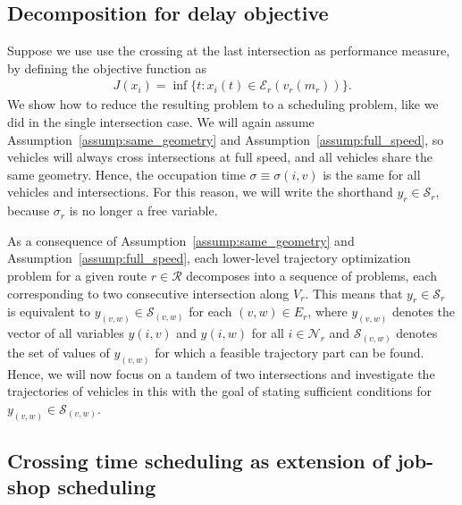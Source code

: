 \documentclass[a4paper]{article}
\theoremstyle{definition}
\theoremstyle{plain}
\begin{document}
\subsection{Decomposition for delay objective}

Suppose we use use the crossing at the last intersection as performance measure, by defining the
objective function as
\begin{align*}
  J(x_{i}) = \inf \{ t: x_{i}(t) \in \mathcal{E}_{r}(v_{r}(m_{r}))\} .
\end{align*}
%
We show how to reduce the resulting problem to a scheduling problem, like we did
in the single intersection case.
%
We will again assume Assumption~\ref{assump:same_geometry} and
Assumption~\ref{assump:full_speed}, so vehicles will always cross intersections
at full speed, and all vehicles share the same geometry. Hence, the occupation
time $\sigma \equiv \sigma(i,v)$ is the same for all vehicles and intersections. For this
reason, we will write the shorthand $y_{r} \in \mathcal{S}_{r}$, because $\sigma_{r}$
is no longer a free variable.

As a consequence of Assumption~\ref{assump:same_geometry} and Assumption~\ref{assump:full_speed},
each lower-level trajectory optimization problem for a given route
$r \in \mathcal{R}$ decomposes into a sequence of problems, each corresponding to
two consecutive intersection along $V_{r}$.
%
This means that $y_{r} \in \mathcal{S}_{r}$ is equivalent to
$y_{(v,w)} \in \mathcal{S}_{(v,w)}$ for each $(v,w) \in E_{r}$, where
$y_{(v,w)}$ denotes the vector of all variables $y(i, v)$ and $y(i, w)$ for all
$i \in \mathcal{N}_{r}$ and $\mathcal{S}_{(v,w)}$ denotes the set of values of $y_{(v,w)}$ for which a feasible trajectory part can be found.
%
Hence, we will now focus on a tandem of two intersections and investigate the
trajectories of vehicles in this with the goal of stating sufficient conditions
for $y_{(v,w)} \in \mathcal{S}_{(v,w)}$.

\subsection{Crossing time scheduling as extension of job-shop scheduling}
\end{document}
